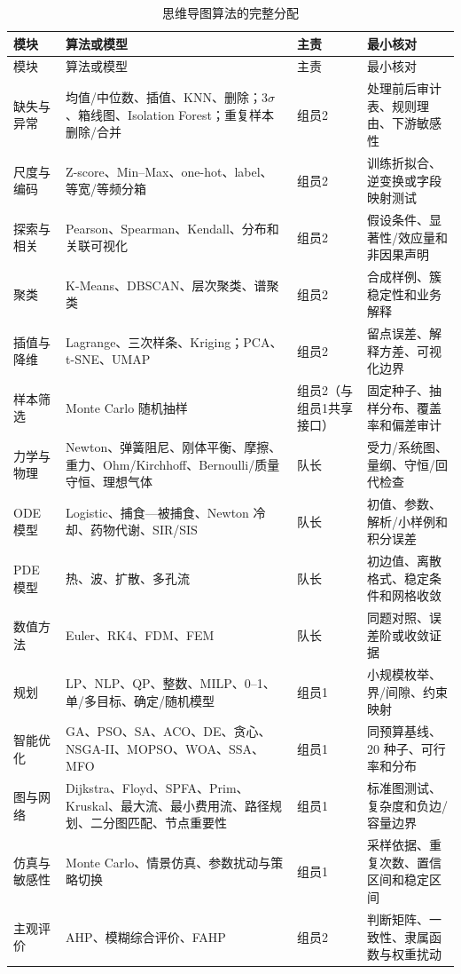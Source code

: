 \documentclass[UTF8,a4paper,12pt]{ctexart}
\begin{document}
\begin{longtable}{p{2.1cm}p{5.0cm}p{2.0cm}p{5.5cm}}
\caption{思维导图算法的完整分配}\label{tab:algorithm-owner}\\
\toprule
模块 & 算法或模型 & 主责 & 最小核对\\
\midrule
\endfirsthead
\toprule
模块 & 算法或模型 & 主责 & 最小核对\\
\midrule
\endhead
缺失与异常 & 均值/中位数、插值、KNN、删除；$3\sigma$、箱线图、Isolation Forest；重复样本删除/合并 & 组员2 & 处理前后审计表、规则理由、下游敏感性\\
尺度与编码 & Z-score、Min--Max、one-hot、label、等宽/等频分箱 & 组员2 & 训练折拟合、逆变换或字段映射测试\\
探索与相关 & Pearson、Spearman、Kendall、分布和关联可视化 & 组员2 & 假设条件、显著性/效应量和非因果声明\\
聚类 & K-Means、DBSCAN、层次聚类、谱聚类 & 组员2 & 合成样例、簇稳定性和业务解释\\
插值与降维 & Lagrange、三次样条、Kriging；PCA、t-SNE、UMAP & 组员2 & 留点误差、解释方差、可视化边界\\
样本筛选 & Monte Carlo 随机抽样 & 组员2（与组员1共享接口） & 固定种子、抽样分布、覆盖率和偏差审计\\
力学与物理 & Newton、弹簧阻尼、刚体平衡、摩擦、重力、Ohm/Kirchhoff、Bernoulli/质量守恒、理想气体 & 队长 & 受力/系统图、量纲、守恒/回代检查\\
ODE 模型 & Logistic、捕食—被捕食、Newton 冷却、药物代谢、SIR/SIS & 队长 & 初值、参数、解析/小样例和积分误差\\
PDE 模型 & 热、波、扩散、多孔流 & 队长 & 初边值、离散格式、稳定条件和网格收敛\\
数值方法 & Euler、RK4、FDM、FEM & 队长 & 同题对照、误差阶或收敛证据\\
规划 & LP、NLP、QP、整数、MILP、0--1、单/多目标、确定/随机模型 & 组员1 & 小规模枚举、界/间隙、约束映射\\
智能优化 & GA、PSO、SA、ACO、DE、贪心、NSGA-II、MOPSO、WOA、SSA、MFO & 组员1 & 同预算基线、20 种子、可行率和分布\\
图与网络 & Dijkstra、Floyd、SPFA、Prim、Kruskal、最大流、最小费用流、路径规划、二分图匹配、节点重要性 & 组员1 & 标准图测试、复杂度和负边/容量边界\\
仿真与敏感性 & Monte Carlo、情景仿真、参数扰动与策略切换 & 组员1 & 采样依据、重复次数、置信区间和稳定区间\\
主观评价 & AHP、模糊综合评价、FAHP & 组员2 & 判断矩阵、一致性、隶属函数与权重扰动\\

\end{longtable}
\end{document}
